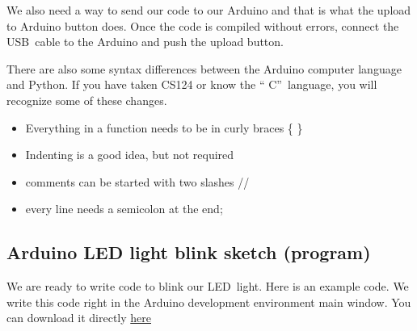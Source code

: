 We also need a way to send our code to our Arduino and that is what the
upload to Arduino button does. Once the code is compiled without errors,
connect the USB\ cable to the Arduino and push the upload button.

There are also some syntax differences between the Arduino computer language
and Python. If you have taken CS124 or know the \textquotedblleft
C\textquotedblright\ language, you will recognize some of these changes.

\begin{itemize}
	\item Everything in a function needs to be in curly braces \{ \}
	\item Indenting is a good idea, but not required
	\item comments can be started with two slashes //
	\item every line needs a semicolon at the end;
\end{itemize}

\subsection{Arduino LED light blink sketch (program)}

We are ready to write code to blink our LED\ light. Here is an example code.
We write this code right in the Arduino development environment main window. You can download it directly %
\href{https://github.com/rtlines/IntermediateLabPH250/blob/main/Code/IntroBlink.ino}{here}



% 
% 
% 
% 
% 
% 

